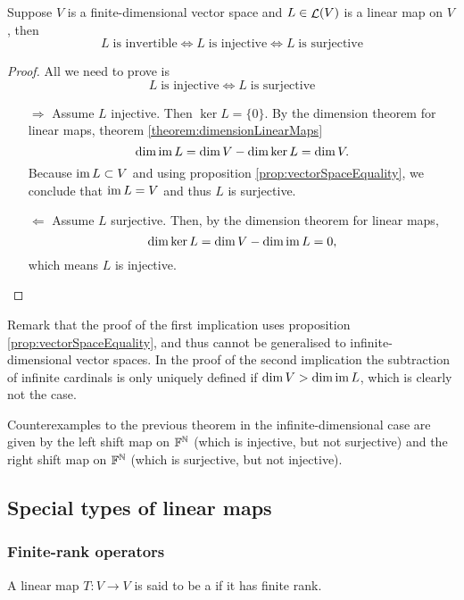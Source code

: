 \begin{proposition} \label{prop:invertibleFiniteDim}
Suppose $V$ is a finite-dimensional vector space and $L\in \mathop{\mathcal{L}}(V)$ is a linear map on $V$, then
\[ L \;\text{is invertible} \iff L \;\text{is injective} \iff L \;\text{is surjective} \]
\end{proposition}
\begin{proof}
All we need to prove is
\[ L \;\text{is injective} \iff L \;\text{is surjective} \]
\begin{itemize}
\item[$\boxed{\Rightarrow}$] Assume $L$ injective. Then $\ker L = \{0\}$. By the dimension theorem for linear maps, theorem \ref{theorem:dimensionLinearMaps}
\[ \dim \operatorname{im} L = \dim V - \dim \ker L = \dim V. \]
Because $\operatorname{im} L \subset V$ and using proposition \ref{prop:vectorSpaceEquality}, we conclude that $\operatorname{im} L = V$ and thus $L$ is surjective.
\item[$\boxed{\Leftarrow}$] Assume $L$ surjective. Then, by the dimension theorem for linear maps,
\[ \dim \ker L = \dim V - \dim \operatorname{im} L = 0, \]
which means $L$ is injective.
\end{itemize}
\end{proof}
Remark that the proof of the first implication uses proposition \ref{prop:vectorSpaceEquality}, and thus cannot be generalised to infinite-dimensional vector spaces. In the proof of the second implication the subtraction of infinite cardinals is only uniquely defined if  $\dim V > \dim \operatorname{im} L$, which is clearly not the case.

\begin{example}
Counterexamples to the previous theorem in the infinite-dimensional case are given by the left shift map on $\mathbb{F}^{\mathbb{N}}$ (which is injective, but not surjective) and the right shift map on $\mathbb{F}^{\mathbb{N}}$ (which is surjective, but not injective).
\end{example}


\subsection{Special types of linear maps}
\subsubsection{Finite-rank operators}
\begin{definition}
A linear map $T: V\to V$ is said to be a  if it has finite rank.
\end{definition}
